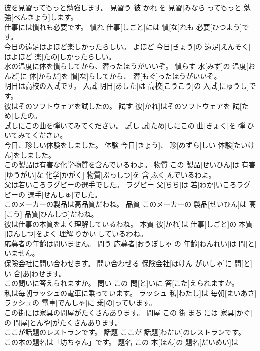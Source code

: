 \documentclass[8pt]{extreport}
\begin{document}
\begin{CJK}{UTF8}{min}
\\	彼を見習ってもっと勉強します。	見習う	彼[かれ]を 見習[みなら]ってもっと 勉強[べんきょう]します。	
\\	仕事には慣れも必要です。	慣れ	仕事[しごと]には 慣[な]れも 必要[ひつよう]です。	
\\	今日の遠足はよほど楽しかったらしい。	よほど	今日[きょう]の 遠足[えんそく]はよほど 楽[たの]しかったらしい。	
\\	水の温度に体を慣らしてから、潜ったほうがいいぞ。	慣らす	水[みず]の 温度[おんど]に 体[からだ]を 慣[な]らしてから、 潜[もぐ]ったほうがいいぞ。	
\\	明日は高校の入試です。	入試	明日[あした]は 高校[こうこう]の 入試[にゅうし]です。	
\\	彼はそのソフトウェアを試したの。	試す	彼[かれ]はそのソフトウェアを 試[ため]したの。	
\\	試しにこの曲を弾いてみてください。	試し	試[ため]しにこの 曲[きょく]を 弾[ひ]いてみてください。	
\\	今日、珍しい体験をしました。	体験	今日[きょう]、 珍[めずら]しい 体験[たいけん]をしました。	
\\	この製品は有害な化学物質を含んでいるわよ。	物質	この 製品[せいひん]は 有害[ゆうがい]な 化学[かがく] 物質[ぶっしつ]を 含[ふく]んでいるわよ。	
\\	父は若いころラグビーの選手でした。	ラグビー	父[ちち]は 若[わか]いころラグビーの 選手[せんしゅ]でした。	
\\	このメーカーの製品は高品質だわね。	品質	このメーカーの 製品[せいひん]は 高[こう] 品質[ひんしつ]だわね。	
\\	彼は仕事の本質をよく理解しているわね。	本質	彼[かれ]は 仕事[しごと]の 本質[ほんしつ]をよく 理解[りかい]しているわね。	
\\	応募者の年齢は問いません。	問う	応募者[おうぼしゃ]の 年齢[ねんれい]は 問[と]いません。	
\\	保険会社に問い合わせます。	問い合わせる	保険会社[ほけん がいしゃ]に 問[と]い 合[あ]わせます。	
\\	この問いに答えられますか。	問い	この 問[と]いに 答[こた]えられますか。	
\\	私は毎朝ラッシュの電車に乗っています。	ラッシュ	私[わたし]は 毎朝[まいあさ]ラッシュの 電車[でんしゃ]に 乗[の]っています。	
\\	この街には家具の問屋がたくさんあります。	問屋	この 街[まち]には 家具[かぐ]の 問屋[とんや]がたくさんあります。	
\\	ここが話題のレストランです。	話題	ここが 話題[わだい]のレストランです。	
\\	この本の題名は「坊ちゃん」です。	題名	この 本[ほん]の 題名[だいめい]は

\end{CJK}
\end{document}
